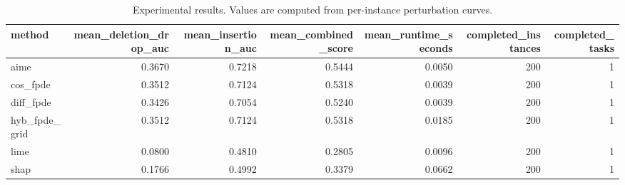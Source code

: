\begin{table}[t]
\caption{Experimental results. Values are computed from per-instance perturbation curves.}
\label{tab:main_results_computed}
\centering
\begin{tabular}{lrrrrrr}
\toprule
method & mean\_deletion\_drop\_auc & mean\_insertion\_auc & mean\_combined\_score & mean\_runtime\_seconds & completed\_instances & completed\_tasks \\
\midrule
aime & 0.3670 & 0.7218 & 0.5444 & 0.0050 & 200 & 1 \\
cos\_fpde & 0.3512 & 0.7124 & 0.5318 & 0.0039 & 200 & 1 \\
diff\_fpde & 0.3426 & 0.7054 & 0.5240 & 0.0039 & 200 & 1 \\
hyb\_fpde\_grid & 0.3512 & 0.7124 & 0.5318 & 0.0185 & 200 & 1 \\
lime & 0.0800 & 0.4810 & 0.2805 & 0.0096 & 200 & 1 \\
shap & 0.1766 & 0.4992 & 0.3379 & 0.0662 & 200 & 1 \\
\bottomrule
\end{tabular}

\end{table}
